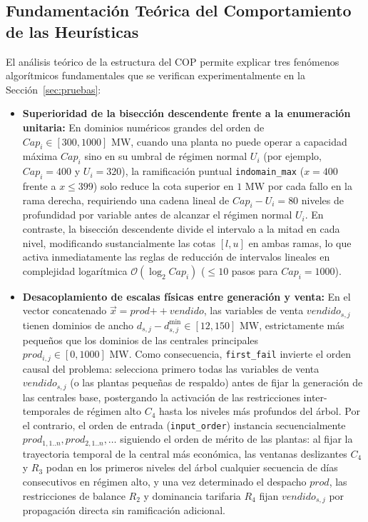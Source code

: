 \subsection{Fundamentación Teórica del Comportamiento de las Heurísticas}
\label{subsec:teoria_busqueda}

El análisis teórico de la estructura del COP permite explicar tres fenómenos algorítmicos fundamentales que se verifican experimentalmente en la Sección~\ref{sec:pruebas}:

\begin{itemize}
    \item \textbf{Superioridad de la bisección descendente frente a la enumeración unitaria:}
    En dominios numéricos grandes del orden de $Cap_i \in [300, 1000]\text{ MW}$, cuando una planta no puede operar a capacidad máxima $Cap_i$ sino en su umbral de régimen normal $U_i$ (por ejemplo, $Cap_i = 400$ y $U_i = 320$), la ramificación puntual \texttt{indomain\_max} ($x = 400$ frente a $x \le 399$) solo reduce la cota superior en $1\text{ MW}$ por cada fallo en la rama derecha, requiriendo una cadena lineal de $Cap_i - U_i = 80$ niveles de profundidad por variable antes de alcanzar el régimen normal $U_i$. En contraste, la bisección descendente divide el intervalo a la mitad en cada nivel, modificando sustancialmente las cotas $[l, u]$ en ambas ramas, lo que activa inmediatamente las reglas de reducción de intervalos lineales en complejidad logarítmica $\mathcal{O}(\log_2 Cap_i)$ ($\le 10$ pasos para $Cap_i = 1000$).

    \item \textbf{Desacoplamiento de escalas físicas entre generación y venta:}
    En el vector concatenado $\vec{x} = prod \mathbin{+\!+} vendido$, las variables de venta $vendido_{s,j}$ tienen dominios de ancho $d_{s,j} - d^{\min}_{s,j} \in [12, 150]\text{ MW}$, estrictamente más pequeños que los dominios de las centrales principales $prod_{i,j} \in [0, 1000]\text{ MW}$. Como consecuencia, \texttt{first\_fail} invierte el orden causal del problema: selecciona primero todas las variables de venta $vendido_{s,j}$ (o las plantas pequeñas de respaldo) antes de fijar la generación de las centrales base, postergando la activación de las restricciones inter-temporales de régimen alto $C_4$ hasta los niveles más profundos del árbol. Por el contrario, el orden de entrada (\texttt{input\_order}) instancia secuencialmente $prod_{1, 1..n}, prod_{2, 1..n}, \dots$ siguiendo el orden de mérito de las plantas: al fijar la trayectoria temporal de la central más económica, las ventanas deslizantes $C_4$ y $R_3$ podan en los primeros niveles del árbol cualquier secuencia de días consecutivos en régimen alto, y una vez determinado el despacho $prod$, las restricciones de balance $R_2$ y dominancia tarifaria $R_4$ fijan $vendido_{s,j}$ por propagación directa sin ramificación adicional.


\end{itemize}
